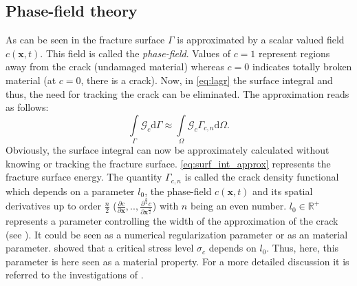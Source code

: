\subsection{Phase-field theory} \label{sec:ph_approx}
As can be seen in  the fracture surface $\Gamma$ is approximated by a scalar valued field $c\left(\mathbf{x},t\right)$. This field is called the  \textit{phase-field}. Values of $c=1$ represent regions away from the crack (undamaged material) whereas $c=0$ indicates totally broken material (at $c=0$, there is a crack). Now, in \eqref{eq:lagr} the surface integral and thus, the need for tracking the crack can be eliminated. The approximation reads as follows:
\begin{equation} \label{eq:surf_int_approx}
	\int\limits_{\Gamma}\mathcal{G}_{c}\mathrm{d}\Gamma \approx \int\limits_{\Omega}\mathcal{G}_{c}\Gamma_{c,n}\mathrm{d}\Omega.
\end{equation}
Obviously, the surface integral can now be approximately calculated without knowing or tracking the fracture surface. \eqref{eq:surf_int_approx} represents the fracture surface energy. The quantity $\Gamma_{c,n}$ is called the crack density functional which depends on a parameter $l_{0}$, the phase-field $c\left(\mathbf{x},t\right)$ and its spatial derivatives up to order $\frac{n}{2}$ ($\frac{\partial c}{\partial \mathbf{x}},..,\frac{\partial^{\frac{n}{2}} c}{\partial \mathbf{x}^{\frac{n}{2}}}$) with $n$ being an even number. $l_{0}\in\mathbb{R}^{+}$ represents a parameter controlling the width of the approximation of the crack (see ). It could be seen as a numerical regularization parameter or as an material parameter. \citet{01_PF_dyn_brittle} showed that a critical stress level $\sigma_{c}$ depends on $l_{0}$. Thus, here, this parameter is here seen as a material property. For a more detailed discussion it is referred to the investigations of \citet{07_PF_l0}.

